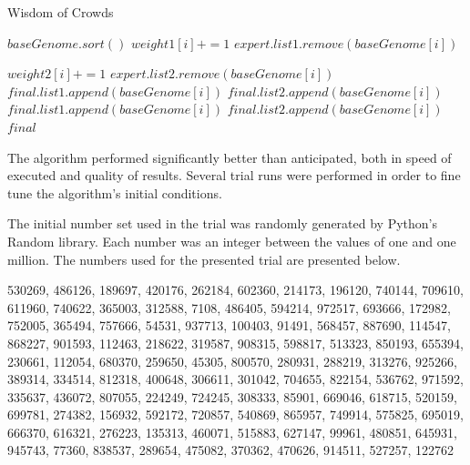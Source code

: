 \documentclass{article}
\begin{document}
\begin{algorithm}
\caption{Wisdom of Crowds}
\begin{algorithmic}
	\State $baseGenome.sort()$	
				\State $weight1[i] += 1$
				\State $expert.list1.remove(baseGenome[i])$
			\EndIf
			
				\State $weight2[i] += 1$
				\State $expert.list2.remove(baseGenome[i])$
			\EndIf
		\EndFor
	\EndFor
			\State $final.list1.append(baseGenome[i])$
			\State $final.list2.append(baseGenome[i])$
		\Else
				\State $final.list1.append(baseGenome[i])$
			\Else
				\State $final.list2.append(baseGenome[i])$
			\EndIf
		\EndIf
	\EndFor
	\State\Return $final$
\EndFunction
\end{algorithmic}
\end{algorithm}

\newpage
{}

The algorithm performed significantly better than anticipated, both in speed of executed and quality of results. Several trial runs were performed in order to fine tune the algorithm's initial conditions.\\


The initial number set used in the trial was randomly generated by Python's Random library. Each number was an integer between the values of one and one million. The numbers used for the presented trial are presented below.

\begin{multicols}{3}

530269, 486126, 189697, 420176, 262184, 602360, 214173, 196120, 740144, 709610, 611960, 740622, 365003, 312588, 7108, 486405, 594214, 972517, 693666, 172982, 752005, 365494, 757666, 54531, 937713, 100403, 91491, 568457, 887690, 114547, 868227, 901593, 112463, 218622, 319587, 908315, 598817, 513323, 850193, 655394, 230661, 112054, 680370, 259650, 45305, 800570, 280931, 288219, 313276, 925266, 389314, 334514, 812318, 400648, 306611, 301042, 704655, 822154, 536762, 971592, 335637, 436072, 807055, 224249, 724245, 308333, 85901, 669046, 618715, 520159, 699781, 274382, 156932, 592172, 720857, 540869, 865957, 749914, 575825, 695019, 666370, 616321, 276223, 135313, 460071, 515883, 627147, 99961, 480851, 645931, 945743, 77360, 838537, 289654, 475082, 370362, 470626, 914511, 527257, 122762\\

\end{multicols}
\end{document}
